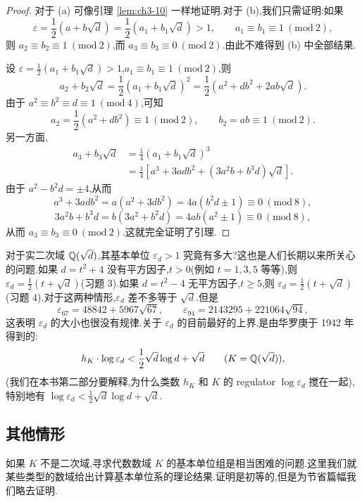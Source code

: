 \begin{proof}
对于 (a) 可像引理 \ref{lem:ch3-10} 一样地证明.对于 (b),我们只需证明:如果
\[
  \varepsilon=\frac{1}{2}(a+b\sqrt{d})=\frac{1}{2}(a_1+b_1\sqrt{d})>1,\qquad a_1\equiv b_1\equiv 1\ (\mathrm{mod}\ 2),
\]
则 $a_2\equiv b_2\equiv 1\ (\mathrm{mod}\ 2)$,而 $a_3\equiv b_3\equiv 0\ (\mathrm{mod}\ 2)$.由此不难得到 (b) 中全部结果.

设 $\varepsilon=\frac{1}{2}(a_1+b_1\sqrt{d})>1$,$a_1\equiv b_1\equiv 1\ (\mathrm{mod}\ 2)$,则
\[
  a_2+b_2\sqrt{d}=\frac{1}{2}(a_1+b_1\sqrt{d})^2=\frac{1}{2}(a^2+db^2+2ab\sqrt{d}).
\]
由于 $a^2\equiv b^2\equiv d\equiv 1\ (\mathrm{mod}\ 4)$,可知
\[
  a_2=\frac{1}{2}(a^2+db^2)\equiv 1\ (\mathrm{mod}\ 2),\qquad b_2=ab\equiv 1\ (\mathrm{mod}\ 2).
\]
另一方面,
\begin{align*}
  a_3+b_3\sqrt{d}&=\frac{1}{4}(a_1+b_1\sqrt{d})^3\\
  &=\frac{1}{4}\left[a^3+3adb^2+(3a^2b+b^3d)\sqrt{d}\right].
\end{align*}
由于 $a^2-b^2d=\pm 4$,从而
\[
  a^3+3adb^2=a(a^2+3db^2)=4a(b^2d\pm 1)\equiv 0\ (\mathrm{mod}\ 8),
\]
\[
  3a^2b+b^3d=b(3a^2+b^2d)=4ab(a^2\pm 1)\equiv 0\ (\mathrm{mod}\ 8),
\]
从而 $a_3\equiv b_3\equiv 0\ (\mathrm{mod}\ 2)$.这就完全证明了引理.
\end{proof}

\begin{remark}
对于实二次域 $\mathbb{Q}(\sqrt{d})$,其基本单位 $\varepsilon_d>1$ 究竟有多大?这也是人们长期以来所关心的问题.如果 $d=t^2+4$ 没有平方因子,$t>0$(例如 $t=1,3,5$ 等等),则 $\varepsilon_d=\frac{1}{2}(t+\sqrt{d})$(习题 3).如果 $d=t^2-4$ 无平方因子,$t\geqslant 5$,则 $\varepsilon_d=\frac{1}{2}(t+\sqrt{d})$(习题 4).对于这两种情形,$\varepsilon_d$ 差不多等于 $\sqrt{d}$.但是
\[
  \varepsilon_{67}=48842+5967\sqrt{67},\qquad
  \varepsilon_{94}=2143295+221064\sqrt{94},
\]
这表明 $\varepsilon_d$ 的大小也很没有规律.关于 $\varepsilon_d$ 的目前最好的上界,是由华罗庚于 1942 年得到的:
\[
  h_K\cdot\log\varepsilon_d<\frac{1}{2}\sqrt{d}\log d+\sqrt{d}\qquad(K=\mathbb{Q}(\sqrt{d})),
\]
(我们在本书第二部分要解释,为什么类数 $h_K$ 和 $K$ 的 regulator $\log\varepsilon_d$ 搅在一起),特别地有 $\log\varepsilon_d<\frac{1}{2}\sqrt{d}\log d+\sqrt{d}$.
\end{remark}

\subsection{其他情形}\label{sec:ch3-s2-3}

如果 $K$ 不是二次域,寻求代数数域 $K$ 的基本单位组是相当困难的问题.这里我们就某些类型的数域给出计算基本单位系的理论结果.证明是初等的,但是为节省篇幅我们略去证明.


